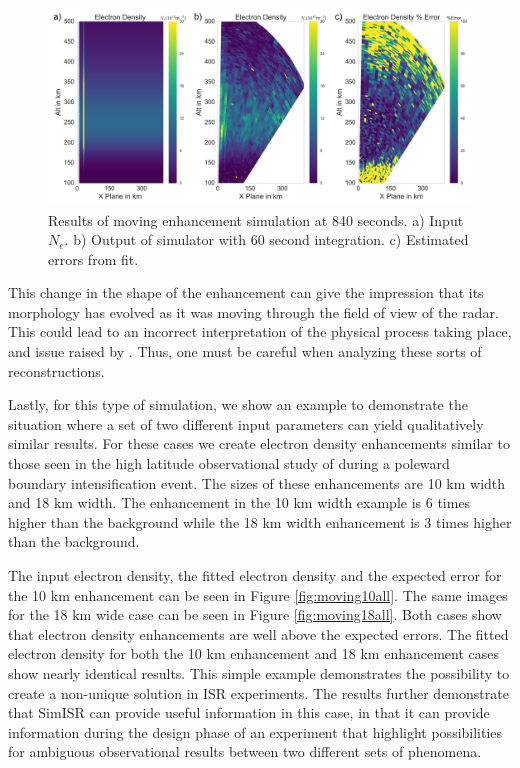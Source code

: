 \begin{figure}[!t]
\centering
\includegraphics[width=6in]{moving14mins}
\caption{Results of moving enhancement simulation at 840 seconds. a) Input $N_e$. b) Output of simulator with 60 second integration. c) Estimated errors from fit.}
\label{fig:moving14mins}
\end{figure}

This change in the shape of the enhancement can give the impression that its morphology has evolved as it was moving through the field of view of the radar. This could lead to an incorrect interpretation of the physical process taking place, and issue raised by \citep{Dahlgren:2012dq}.   Thus, one must be careful when analyzing these sorts of reconstructions.

Lastly, for this type of simulation, we show an example to demonstrate the situation where a set of two different input parameters can yield qualitatively similar results. For these cases we create electron density enhancements similar to those seen in the high latitude observational study of \citep{Semeter:2005fo} during a poleward boundary intensification event. The sizes of these enhancements are 10 km width and 18 km width. The enhancement in the 10 km width example is 6 times higher than the background while the 18 km width enhancement is 3 times higher than the background.

The input electron density, the fitted electron density and the expected error for the 10 km enhancement can be seen in Figure \ref{fig:moving10all}. The same images for the 18 km wide case can be seen in Figure \ref{fig:moving18all}. Both cases show that electron density enhancements are well above the expected errors.
The fitted electron density for both the 10 km enhancement and 18 km enhancement cases show nearly identical results. This simple example demonstrates the possibility to create a non-unique solution in ISR experiments. The results further demonstrate that SimISR can provide useful information in this case, in that it can provide information during the design phase of an experiment that highlight possibilities for ambiguous observational results between two different sets of phenomena. 

